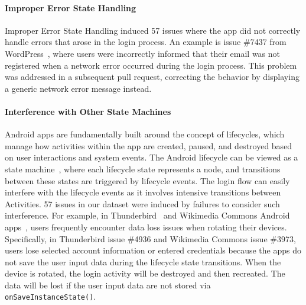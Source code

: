 \paragraph{Improper Error State Handling}
Improper Error State Handling induced 57 issues where the app did not correctly handle errors that arose in the login process. An example is issue \#7437 from WordPress~\cite{wordpress}, where users were incorrectly informed that their email was not registered when a network error occurred during the login process. This problem was addressed in a subsequent pull request, correcting the behavior by displaying a generic network error message instead.

\paragraph{Interference with Other State Machines}
Android apps are fundamentally built around the concept of lifecycles, which manage how activities within the app are created, paused, and destroyed based on user interactions and system events. The Android lifecycle can be viewed as a state machine~\cite{google-android-doc-state}, where each lifecycle state represents a node, and transitions between these states are triggered by lifecycle events.
The login flow can easily interfere with the lifecycle events as it involves intensive transitions between Activities. 
57 issues in our dataset were induced by failures to consider such interference.
For example, in Thunderbird~\cite{thunderbird-android} and Wikimedia Commons Android apps~\cite{commons-android-commons}, users frequently encounter data loss issues when rotating their devices. Specifically, in Thunderbird issue \#4936 and Wikimedia Commons issue \#3973, users lose selected account information or entered credentials because the apps do not save the user input data during the lifecycle state transitions.
When the device is rotated, the login activity will be destroyed and then recreated.
The data will be lost if the user input data are not stored via \texttt{onSaveInstanceState()}.

